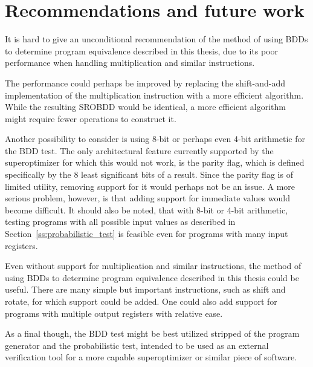\documentclass[a4paper,11pt]{kth-mag}
\begin{document}
\chapter{Recommendations and future work}
\label{ch:recommendations_future_work}

It is hard to give an unconditional recommendation of the method of using BDDs to determine program equivalence described in this thesis, due to its poor performance when handling multiplication and similar instructions.

The performance could perhaps be improved by replacing the shift-and-add implementation of the multiplication instruction with a more efficient algorithm.
While the resulting SROBDD would be identical, a more efficient algorithm might require fewer operations to construct it.

Another possibility to consider is using 8-bit or perhaps even 4-bit arithmetic for the BDD test.
The only architectural feature currently supported by the superoptimizer for which this would not work, is the parity flag, which is defined specifically by the 8 least significant bits of a result.
Since the parity flag is of limited utility, removing support for it would perhaps not be an issue.
A more serious problem, however, is that adding support for immediate values would become difficult.
It should also be noted, that with 8-bit or 4-bit arithmetic, testing programs with all possible input values as described in Section~\ref{ss:probabilistic_test} is feasible even for programs with many input registers.

Even without support for multiplication and similar instructions, the method of using BDDs to determine program equivalence described in this thesis could be useful.
There are many simple but important instructions, such as shift and rotate, for which support could be added.
One could also add support for programs with multiple output registers with relative ease.

As a final though, the BDD test might be best utilized stripped of the program generator and the probabilistic test, intended to be used as an external verification tool for a more capable superoptimizer or similar piece of software.



\end{document}
